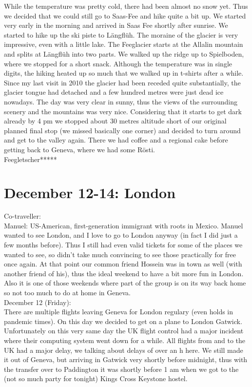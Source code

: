 While the temperature was pretty cold, there had been almost no snow yet. Thus we decided that we could still go to Saas-Fee and hike quite a bit up. We started very early in the morning and arrived in Saas Fee shortly after sunrise. We started to hike up the ski piste to L\"angfl\"uh. The moraine of the glacier is very impressive, even with a little lake. The Feeglacier starts at the Allalin mountain and splits at L\"angfl\"uh into two parts. We walked up the ridge up to Spielboden, where we stopped for a short snack. Although the temperature was in single digits, the hiking heated up so much that we walked up in t-shirts after a while. Since my last visit in 2010 the glacier had been receded quite substantially, the glacier tongue had detached and a few hundred metres were just dead ice nowadays. The day was very clear in sunny, thus the views of the surrounding scenery and the mountains was very nice. Considering that it starts to get dark already by 4 pm we stopped about 30 metres altitude short of our original planned final stop (we missed basically one corner) and decided to turn around and get to the valley again. There we had coffee and a regional cake before getting back to Geneva, where we had some R\"osti.\\

Feegletscher*****\\

\section{December 12-14: London}
\label{London2014}

Co-traveller:\\
Manuel: US-American, first-generation immigrant with roots in Mexico. Manuel wanted to see London, and I love to go to London anyway (in fact I did just a few months before). Thus I still had even valid tickets for some of the places we wanted to see, so didn't take much convincing to see those practically for free once again. At that point our common friend Hossein was in town as well (with another friend of his), thus the ideal weekend to have a bit more fun in London. Also it is one of those weekends where part of the group is on its way back home so not too much to do at home in Geneva.\\

December 12 (Friday):\\
There are multiple flights leaving Geneva for London regulary (even holds in pandemic times). On this day we decided to get on a plane to London Gatwick. Unfortunately on this very same day the UK flight control had a major incident where their computing system went down for a while. All flights from and to the UK had a major delay, we talking about delays of over an h here. We still made it out of Geneva, but arriving in Gatwick very shortly before midnight, thus with the transfer over to Paddington it was shortly before 1 am when we got to the (not so much party for tonight) Kings Cross Keystone hostel.\\

